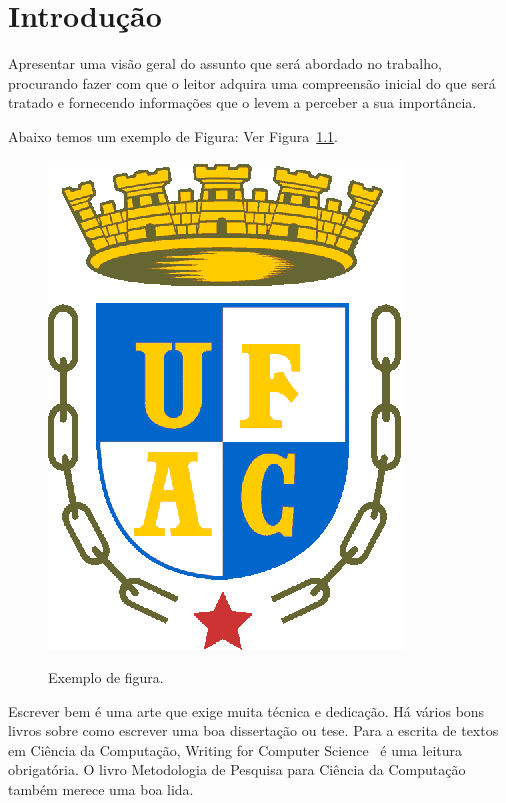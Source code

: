 \documentclass[
	12pt,				    %
	openright,			    %
	oneside,			    %
	a4paper,			    %
    sumario=tradicional,        %
	english,			    %
	brazil,				    %
 ]{abntex2}
\begin{document}
\chapter{Introdução}\label{sec:introducao}
Apresentar uma visão geral do assunto que será abordado no trabalho, procurando fazer com que o leitor adquira uma compreensão inicial do que será tratado e fornecendo informações que o levem a perceber a sua importância.

Abaixo temos um exemplo de Figura: Ver Figura~\ref{fig:exefig}.

\begin{figure}[!ht]
    \centering
    \caption{Exemplo de figura.}
    \includegraphics[width=0.3\linewidth]{figuras/exefig.eps}
    \label{fig:exefig}
\end{figure}

Escrever bem é uma arte que exige muita técnica e dedicação. Há vários bons livros sobre como escrever uma boa dissertação ou tese. Para a escrita de textos em Ciência da Computação, Writing for Computer Science~\cite{zobel2014} é uma leitura obrigatória. O livro Metodologia de Pesquisa para Ciência da Computação~\cite{wazlawick2009} também merece uma boa lida.
\end{document}
